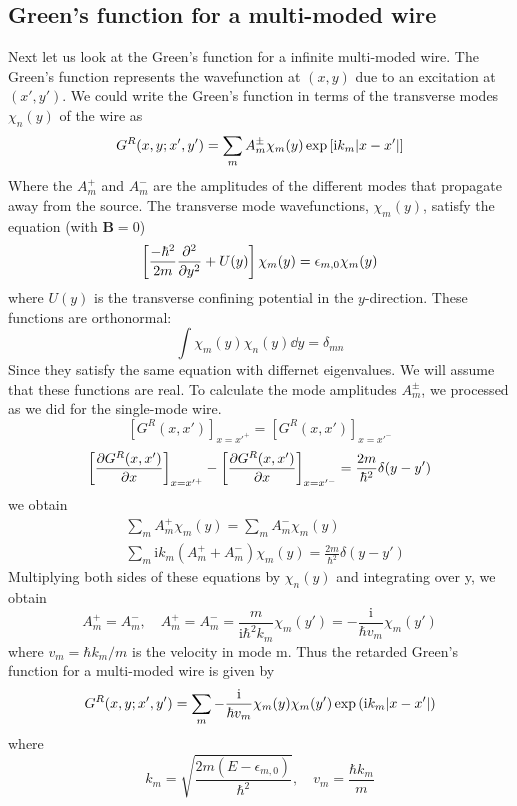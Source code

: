 \documentclass[11pt,a4paper]{book}
\theoremstyle{plain}
\theoremstyle{definition}
\theoremstyle{remark}
\newcommand{\ii}{\mathrm{i}}                      %
\renewcommand{\vec}[1]{\boldsymbol{#1}}
\begin{document}
\subsection{Green's function for a multi-moded wire}
Next let us look at the Green's function for a infinite multi-moded wire. The Green's function represents the wavefunction at $(x,y)$ due to an excitation at $(x',y')$. We could write the Green's function in terms of the transverse modes $\chi_n(y)$ of the wire as
\begin{equation}
    G^R(x,y;x',y') = \sum_m A^{\pm}_m\chi_m(y)\exp \left[\ii k_m \abs{x - x'}\right]
\end{equation}
Where the $A^+_m$ and $A^-_m$ are the amplitudes of the different modes that propagate away from the source. The transverse mode wavefunctions, $\chi_m(y)$, satisfy the equation (with $\vec{B}=0$)
\begin{equation}
    \left[\frac{-\hbar^2}{2 m} \pdv{^2}{y^2} + U(y) \right] \chi_m(y) = \epsilon_{m,0} \chi_m(y)
\end{equation}
where $U(y)$ is the transverse confining potential in the $y$-direction. These functions are orthonormal:
\begin{equation}
    \int \chi_m(y) \chi_n(y) \dd y = \delta_{mn}
\end{equation}
Since they satisfy the same equation with differnet eigenvalues. We will assume that these functions are real. To calculate the mode amplitudes $A^{\pm}_m$, we processed as we did for the single-mode wire.
\begin{equation}
    \left[G^R(x,x')\right]_{x=x'^+} = \left[G^R(x,x')\right]_{x=x'^-}
\end{equation}
\begin{equation}
    \left[ \pdv{G^R(x,x')}{x} \right]_{x=x'^+} - \left[ \pdv{G^R(x,x')}{x} \right]_{x=x'^-} = \frac{2 m}{\hbar^2} \delta(y-y')
\end{equation}
we obtain
\begin{equation}
    \begin{aligned}
        & \sum_m A^+_m \chi_m(y) = \sum_m A^-_m \chi_m(y) \\
        & \sum_m \ii k_m \left(A_m^+ + A_m^-\right)\chi_m(y) = \frac{2 m}{\hbar^2} \delta(y-y')
    \end{aligned}
\end{equation}
Multiplying both sides of these equations by $\chi_n(y)$ and integrating over y, we obtain
\begin{equation}
    A_m^+ = A_m^-,\quad A_m^+ = A_m^- = \frac{m}{\ii \hbar^2 k_m} \chi_m(y') = -\frac{\ii}{\hbar v_m} \chi_m(y')
\end{equation}
where $v_m = \hbar k_m/m$ is the velocity in mode m. Thus the retarded Green's function for a multi-moded wire is given by
\begin{equation}
    G^R(x,y;x',y') = \sum_m -\frac{\ii}{\hbar v_m} \chi_m(y) \chi_m(y') \exp\left(\ii k_m \abs{x - x'}\right)
\end{equation}
where
\begin{equation}
    k_m = \sqrt{\frac{2 m (E - \epsilon_{m,0})}{\hbar^2}}, \quad v_m = \frac{\hbar k_m}{m}
\end{equation}
\end{document}
